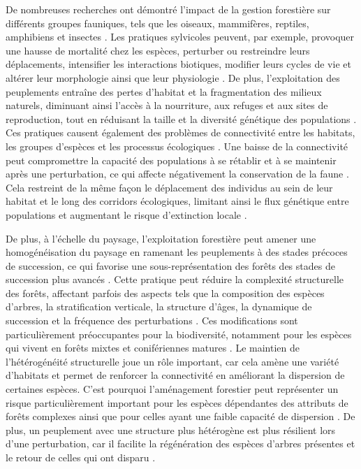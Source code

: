 De nombreuses recherches ont démontré l'impact de la gestion forestière sur différents groupes fauniques, tels que les oiseaux, mammifères, reptiles, amphibiens et insectes \citep{Drapeau2000LandscapeScaleDisturbances,Suffice2015Shorttermeffects,bouchardBeetleCommunityResponse2016b,Hughes2019Impactnatural,Mazerolle2021Woodlandsalamander}. 
Les pratiques sylvicoles peuvent, par exemple, provoquer une hausse de mortalité chez les espèces, perturber ou restreindre leurs déplacements, intensifier les interactions biotiques, modifier leurs cycles de vie et altérer leur morphologie ainsi que leur physiologie \citep{Sergio2018Animalresponses}. 
De plus, l'exploitation des peuplements entraîne des pertes d'habitat et la fragmentation des milieux naturels, diminuant ainsi l'accès à la nourriture, aux refuges et aux sites de reproduction, tout en réduisant la taille et la diversité génétique des populations \citep{Bouderbala2023Longtermeffect}.
Ces pratiques causent également des problèmes de connectivité entre les habitats, les groupes d'espèces et les processus écologiques \citep{Lindenmayer2006Generalmanagement}. 
Une baisse de la connectivité peut compromettre la capacité des populations à se rétablir et à se maintenir après une perturbation, ce qui affecte négativement la conservation de la faune \citep{Lamberson1994ReserveDesign}. 
Cela restreint de la même façon le déplacement des individus au sein de leur habitat et le long des corridors écologiques, limitant ainsi le flux génétique entre populations et augmentant le risque d'extinction locale \citep{Saccheri1998Inbreedingextinction}. 

De plus, à l’échelle du paysage, l'exploitation forestière peut amener une homogénéisation du paysage en ramenant les peuplements à des stades précoces de succession, ce qui favorise une sous-représentation des forêts des stades de succession plus avancés \citep{Cyr2009Forestmanagement,Boucher2017Cumulativepatterns}. 
Cette pratique peut réduire la complexité structurelle des forêts, affectant parfois des aspects tels que la composition des espèces d'arbres, la stratification verticale, la structure d'âges, la dynamique de succession et la fréquence des perturbations \citep{Bergeron2000Speciesstand,Commarmot2005Structurevirgin,Varga2005Treesizediversity}. 
Ces modifications sont particulièrement préoccupantes pour la biodiversité, notamment pour les espèces qui vivent en forêts mixtes et conifériennes matures \citep{Tremblay2018Harvestinginteracts,Cadieux2020Projectedeffects}.
Le maintien de l'hétérogénéité structurelle joue un rôle important, car cela amène une variété d'habitats et permet de renforcer la connectivité en améliorant la dispersion de certaines espèces. 
C’est pourquoi l’aménagement forestier peut représenter un risque particulièrement important pour les espèces dépendantes des attributs de forêts complexes ainsi que pour celles ayant une faible capacité de dispersion  \citep{Norden2001Conceptualproblems,Martin2021indicatorspecies}. 
De plus, un peuplement avec une structure plus hétérogène est plus résilient lors d'une perturbation, car il facilite la régénération des espèces d'arbres présentes et le retour de celles qui ont disparu \citep{Kuuluvainen2009Forestmanagement}. 


